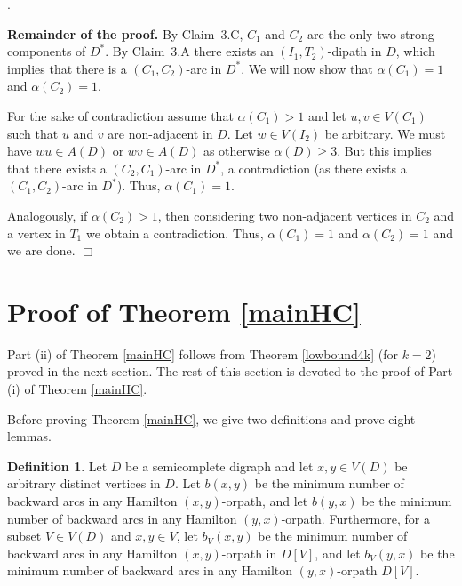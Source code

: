\documentclass{article}
\newcommand{\2}{\vspace{2mm}}
\renewenvironment{proof}[1][]{\par \noindent {\bf Proof#1}.\ }{\hfill$\Box$
\par \vspace{11pt}}
\newtheorem{theorem}{Theorem}[section]
\theoremstyle{definition}
\newtheorem{definition}[theorem]{Definition}
\begin{document}
\begin{proof}
\2

{\bf Remainder of the proof.} By Claim~3.C, $C_1$ and $C_2$ are the only two strong components of $D^*$.
By Claim~3.A there exists an $(I_1,T_2)$-dipath in $D$, which implies that there is a $(C_1,C_2)$-arc in $D^*$.
We will now show that $\alpha(C_1)=1$ and $\alpha(C_2)=1$.

For the sake of contradiction assume that $\alpha(C_1)>1$ and let $u,v \in V(C_1)$ such that $u$ and $v$ are non-adjacent in $D$.
Let $w \in V(I_2)$ be arbitrary. We must have $wu \in A(D)$ or $wv \in A(D)$ as otherwise $\alpha(D) \geq 3$.
But this implies that there exists a $(C_2,C_1)$-arc in $D^*$, a contradiction (as there exists a $(C_1,C_2)$-arc in $D^*$).
Thus, $\alpha(C_1)=1$.

Analogously, if $\alpha(C_2)>1$, then considering two non-adjacent vertices in $C_2$ and a vertex in $T_1$ we obtain a 
contradiction. Thus, $\alpha(C_1)=1$ and $\alpha(C_2)=1$ and we are done.
\end{proof}


\section{Proof of Theorem \ref{mainHC}}\label{sec:HC}

Part (ii) of Theorem \ref{mainHC} follows from Theorem \ref{lowbound4k} (for $k=2$) proved in the next section. 
The rest of this section is devoted to the proof of Part (i) of Theorem \ref{mainHC}.


Before proving Theorem \ref{mainHC}, we give two definitions and prove eight lemmas.


\begin{definition}
Let $D$ be a semicomplete digraph and let $x,y \in V(D)$ be arbitrary distinct vertices in $D$.
Let  $b(x,y)$ be the minimum number of backward arcs in any Hamilton $(x,y)$-orpath, and let
$b(y,x)$ be the minimum number of backward arcs in 
any Hamilton $(y,x)$-orpath.  
Furthermore, for a subset $V \in V(D)$ and $x,y \in V$, let $b_V(x,y)$ be the minimum number of backward arcs in any Hamilton $(x,y)$-orpath in $D[V]$, and let $b_V(y,x)$ be the minimum number of backward arcs in any Hamilton $(y,x)$-orpath $D[V]$.
\end{definition}
\end{document}

